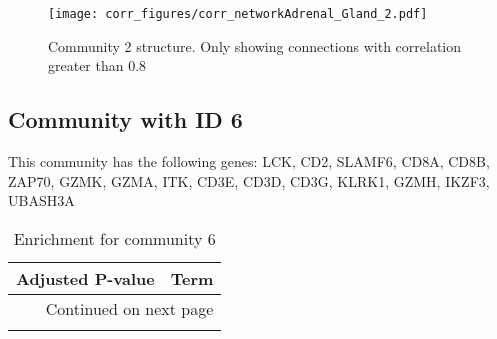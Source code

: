 \begin{figure}[h!]
\centering
\texttt{[image: corr\_figures/corr\_networkAdrenal\_Gland\_2.pdf]}
\caption{Community 2 structure. Only showing connections with correlation greater than 0.8}
\end{figure}




\subsection*{Community with ID 6}
This community has the following genes: LCK, CD2, SLAMF6, CD8A, CD8B, ZAP70, GZMK, GZMA, ITK, CD3E, CD3D, CD3G, KLRK1, GZMH, IKZF3, UBASH3A
\\
\begin{longtable}{p{2.4cm}p{14.5cm}}
\caption{Enrichment for community 6}\\
\toprule
Adjusted \newline P-value &                                                                                                                      Term \\
\midrule
\endhead
\midrule
\multicolumn{2}{r}{{Continued on next page}} \\
\midrule
\endfoot


\end{longtable}
